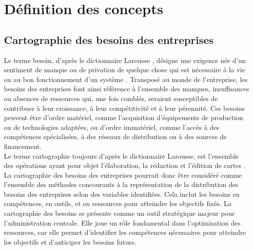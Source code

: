 \documentclass[12pt, a4paper, oneside]{report}
\begin{document}
	\section{Définition des concepts }
	\label{sec:concepts}
	
	\subsection{Cartographie des besoins des entreprises}
	
	Le terme besoin, d'après le dictionnaire Larousse , désigne une exigence née d'un sentiment de manque ou de privation de quelque chose qui est nécessaire à la vie ou au bon fonctionnement d'un système \cite{larousse}. Transposé au monde de l'entreprise, les besoins des entreprises font ainsi référence à l'ensemble des manques, insuffisances ou absences de ressources qui, une fois comblés, seraient susceptibles de contribuer à leur croissance, à leur compétitivité et à leur pérennité. Ces besoins peuvent être d'ordre matériel, comme l'acquisition d'équipements de production ou de technologies adaptées, ou d'ordre immatériel, comme l'accès à des compétences spécialisées, à des réseaux de distribution ou à des sources de financement.\\
	
	Le terme cartographie toujours d’après le dictionnaire Larousse, est l'ensemble des opérations ayant pour objet l'élaboration, la rédaction et l'édition de cartes \cite{larousse}. La cartographie des besoins des entreprises pourrait donc être considéré comme l’ensemble des méthodes concourants à la représentation de la distribution des besoins des entreprises selon des variables identifiées. Cela inclut les besoins en compétences, en outils, et en ressources pour atteindre les objectifs fixés\cite{oserentreprendre}. La cartographie des besoins se présente comme un outil stratégique majeur pour l'administration centrale. Elle joue un rôle fondamental dans l’optimisation des ressources, car elle permet d’identifier les compétences nécessaires pour atteindre les objectifs et d’anticiper les besoins futurs.
	\\
	
\end{document}
